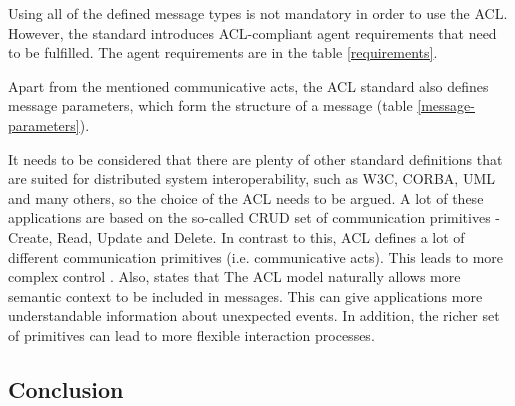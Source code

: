\documentclass[0main.tex]{subfiles}
\begin{document}
Using all of the defined message types is not mandatory in order to use the ACL.
However, the standard introduces ACL-compliant agent requirements that need to be fulfilled. The 
agent requirements are in the table \ref{requirements}. 

Apart from the mentioned communicative acts, the ACL standard also defines message parameters, which
form the structure of a message (table \ref{message-parameters}).



It needs to be considered that there are plenty of other standard definitions that are suited for
distributed system interoperability, such as W3C, CORBA, UML and many others, so the choice 
of the ACL needs to be argued. A lot of these applications are based on the so-called CRUD set of 
communication primitives - Create, Read, Update and Delete. In contrast to this, ACL defines a lot 
of different communication primitives (i.e. communicative acts). This leads to more complex control 
\cite{Poslad2007}. 
Also, \cite{Poslad2007} states that The ACL model naturally allows more semantic context
to be included in messages. This can give applications more understandable information about
unexpected events. In addition, the richer set of primitives can lead to more flexible
interaction processes.

\subsection{Conclusion}
\end{document}
